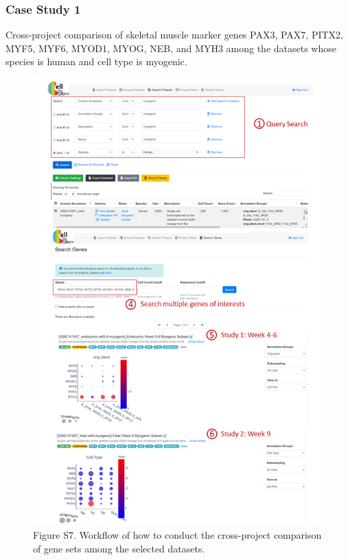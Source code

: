 \documentclass[
]{book}
\begin{document}
\hypertarget{case-study-1}{%
\subsubsection{Case Study 1}\label{case-study-1}}

Cross-project comparison of skeletal muscle marker genes PAX3, PAX7, PITX2, MYF5, MYF6, MYOD1, MYOG, NEB, and MYH3 among the datasets whose species is human and cell type is myogenic.

\begin{figure}
\centering
\includegraphics{figures/s7.png}
\caption{Figure S7. Workflow of how to conduct the cross-project comparison of gene sets among the selected datasets.}
\end{figure}
\end{document}
